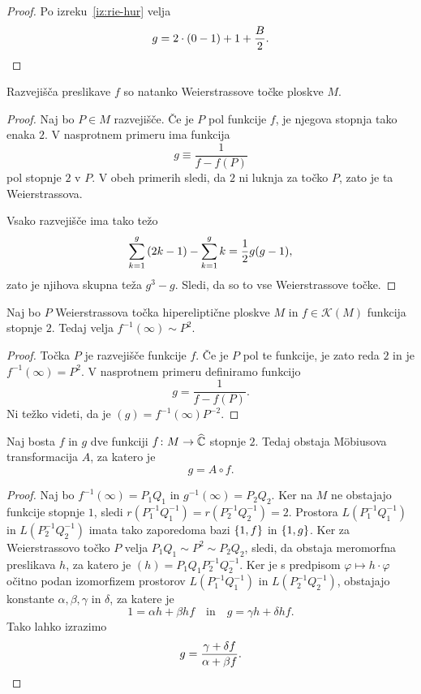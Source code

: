 \begin{proof}
Po izreku~\ref{iz:rie-hur} velja
\[
g = 2 \cdot (0-1) + 1 + \frac{B}{2}. \qedhere
\]
\end{proof}

\begin{trditev}
Razvejišča preslikave $f$ so natanko Weierstrassove točke ploskve
$M$.
\end{trditev}

\begin{proof}
Naj bo $P \in M$ razvejišče. Če je $P$ pol funkcije $f$, je njegova
stopnja tako enaka $2$. V nasprotnem primeru ima funkcija
\[
g \equiv \frac{1}{f - f(P)}
\]
pol stopnje $2$ v $P$. V obeh primerih sledi, da $2$ ni luknja za
točko $P$, zato je ta Weierstrassova.

Vsako razvejišče ima tako težo
\[
\sum_{k=1}^g \left(2k-1\right) - \sum_{k=1}^g k = \frac{1}{2} g (g-1),
\]
zato je njihova skupna teža $g^3 - g$. Sledi, da so to vse
Weierstrassove točke.
\end{proof}

\begin{lema}
Naj bo $P$ Weierstrassova točka hipereliptične ploskve $M$ in
$f \in \mathscr{K}(M)$ funkcija stopnje $2$. Tedaj velja
$f^{-1}(\infty) \sim P^2$.
\end{lema}

\begin{proof}
Točka $P$ je razvejišče funkcije $f$. Če je $P$ pol te funkcije, je
zato reda $2$ in je $f^{-1}(\infty) = P^2$. V nasprotnem primeru
definiramo funkcijo
\[
g = \frac{1}{f - f(P)}.
\]
Ni težko videti, da je $(g) = f^{-1}(\infty) P^{-2}$.
\end{proof}

\begin{trditev}
Naj bosta $f$ in $g$ dve funkciji $f \colon M \to \widehat{\mathbb{C}}$ stopnje
$2$. Tedaj obstaja Möbiusova transformacija $A$, za katero je
\[
g = A \circ f.
\]
\end{trditev}

\begin{proof}
Naj bo $f^{-1}(\infty) = P_1 Q_1$ in $g^{-1}(\infty) = P_2 Q_2$.
Ker na $M$ ne obstajajo funkcije stopnje $1$, sledi
$r(P_1^{-1} Q_1^{-1}) = r(P_2^{-1} Q_2^{-1}) = 2$. Prostora
$L(P_1^{-1} Q_1^{-1})$ in $L(P_2^{-1} Q_2^{-1})$ imata tako
zaporedoma bazi $\left\{1, f\right\}$ in $\left\{1, g\right\}$. Ker za Weierstrassovo
točko $P$ velja $P_1 Q_1 \sim P^2 \sim P_2 Q_2$, sledi, da obstaja
meromorfna preslikava $h$, za katero je
$(h) = P_1 Q_1 P_2^{-1} Q_2^{-1}$. Ker je s predpisom
$\varphi \mapsto h \cdot \varphi$ očitno podan izomorfizem
prostorov $L(P_1^{-1} Q_1^{-1})$ in $L(P_2^{-1} Q_2^{-1})$,
obstajajo konstante $\alpha, \beta, \gamma$ in $\delta$, za katere
je
\[
1 = \alpha h + \beta hf
\quad \text{in} \quad
g = \gamma h + \delta hf.
\]
Tako lahko izrazimo
\[
g = \frac{\gamma + \delta f}{\alpha + \beta f}. \qedhere
\]
\end{proof}


